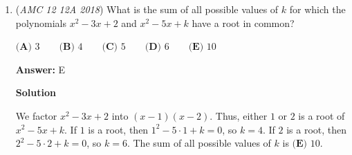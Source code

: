 \begin{enumerate}
\begin{enumerate}
        \item $\mathrm{False}\cup\mathrm{True}=[0,\infty).$

            \end{enumerate}
            We construct the following table:
 \[\begin{array}{c||c|c} & &  \\ [-2.5ex] \textbf{Hiker} & \textbf{False Statement} & \textbf{True Statement} \\ [0.5ex] \hline & & \\ [-2ex] \textbf{Alice} & [6,\infty) & [0,6) \\  & & \\ [-2.25ex] \textbf{Bob} & [0,5] & (5,\infty)  \\ & & \\ [-2.25ex] \textbf{Charlie} & [0,4] & (4,\infty) \end{array}\]Taking the intersection of the true statements, we have 
 \[[0,6)\cap(5,\infty)\cap(4,\infty)=(5,6)\cap(4,\infty)=\boxed{\textbf{(D) } (5,6)}.\]~MRENTHUSIASM

 



\textbf{Solution 2}

Think of the distances as if they are on a number line. Alice claims that $d > 6$, Bob says $d < 5$, while Charlie thinks $d < 4$. This means that all possible numbers less than $5$ and greater than $6$ are included. However, since the three statements are actually false, the distance to the nearest town is one of the numbers not covered. Therefore, the answer is $\boxed{\textbf{(D) } (5,6)}$.

 Education, the Study of Everything

 


 


 


	\item (\textit{AMC 12 12A 2018}) What is the sum of all possible values of $k$ for which the polynomials $x^2 - 3x + 2$ and $x^2 - 5x + k$ have a root in common?


 $\textbf{(A) }3 \qquad\textbf{(B) }4 \qquad\textbf{(C) }5 \qquad\textbf{(D) }6 \qquad\textbf{(E) }10 \qquad$

 \textbf{Answer: }E



\textbf{Solution}

We factor $x^2-3x+2$ into $(x-1)(x-2)$. Thus, either $1$ or $2$ is a root of $x^2-5x+k$. If $1$ is a root, then $1^2-5\cdot1+k=0$, so $k=4$. If $2$ is a root, then $2^2-5\cdot2+k=0$, so $k=6$. The sum of all possible values of $k$ is $\boxed{\textbf{(E) }10}$.


\end{enumerate}
